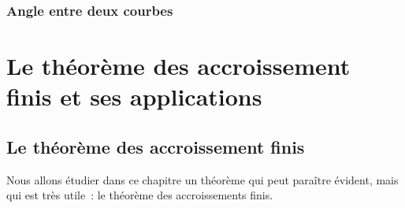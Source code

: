 \documentclass[a4paper,12pt]{article}
\begin{document}

\subsubsection{Angle entre deux courbes}

\section{Le théorème des accroissement finis et ses applications}

\subsection{Le théorème des accroissement finis}
Nous allons étudier dans ce chapitre un théorème qui peut paraître évident, mais qui est très utile~: le théorème des accroissements finis. 
\medskip
\end{document}
